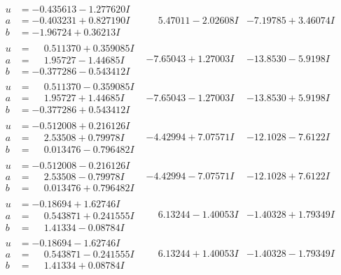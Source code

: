 \documentclass[1p]{elsarticle_modified}
\theoremstyle{definition}
\begin{document}
$$\begin{array}{c|c|c}
\begin{aligned}
u &= -0.435613 - 1.277620 I \\
a &= -0.403231 + 0.827190 I \\
b &= -1.96724 + 0.36213 I\end{aligned}
 & \phantom{-}5.47011 - 2.02608 I & -7.19785 + 3.46074 I \\ \hline\begin{aligned}
u &= \phantom{-}0.511370 + 0.359085 I \\
a &= \phantom{-}1.95727 - 1.44685 I \\
b &= -0.377286 - 0.543412 I\end{aligned}
 & -7.65043 + 1.27003 I & -13.8530 - 5.9198 I \\ \hline\begin{aligned}
u &= \phantom{-}0.511370 - 0.359085 I \\
a &= \phantom{-}1.95727 + 1.44685 I \\
b &= -0.377286 + 0.543412 I\end{aligned}
 & -7.65043 - 1.27003 I & -13.8530 + 5.9198 I \\ \hline\begin{aligned}
u &= -0.512008 + 0.216126 I \\
a &= \phantom{-}2.53508 + 0.79978 I \\
b &= \phantom{-}0.013476 - 0.796482 I\end{aligned}
 & -4.42994 + 7.07571 I & -12.1028 - 7.6122 I \\ \hline\begin{aligned}
u &= -0.512008 - 0.216126 I \\
a &= \phantom{-}2.53508 - 0.79978 I \\
b &= \phantom{-}0.013476 + 0.796482 I\end{aligned}
 & -4.42994 - 7.07571 I & -12.1028 + 7.6122 I \\ \hline\begin{aligned}
u &= -0.18694 + 1.62746 I \\
a &= \phantom{-}0.543871 + 0.241555 I \\
b &= \phantom{-}1.41334 - 0.08784 I\end{aligned}
 & \phantom{-}6.13244 - 1.40053 I & -1.40328 + 1.79349 I \\ \hline\begin{aligned}
u &= -0.18694 - 1.62746 I \\
a &= \phantom{-}0.543871 - 0.241555 I \\
b &= \phantom{-}1.41334 + 0.08784 I\end{aligned}
 & \phantom{-}6.13244 + 1.40053 I & -1.40328 - 1.79349 I \\ \hline\begin{aligned}

\end{aligned}
\end{array}$$
\end{document}
